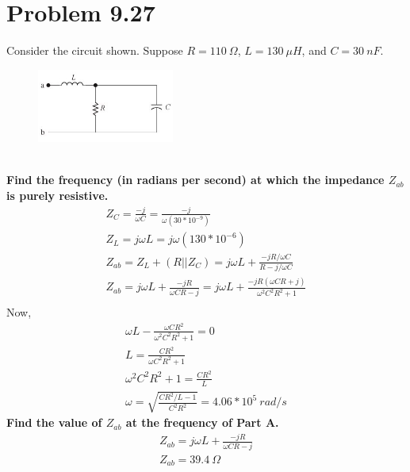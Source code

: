 \documentclass[12pt]{article}
\begin{document}
    \section*{Problem 9.27}
    Consider the circuit shown. Suppose $R = 110\ \Omega$, $L = 130\ \mu H$, and
    $C = 30\ nF$.
    \begin{figure}[h]
        \centering
        \includegraphics[width=0.4\textwidth]{9.27 Circuit.png}
    \end{figure}
    \\
    \textbf{Find the frequency (in radians per second) at which the impedance
    $Z_{ab}$ is purely resistive.}
    \begin{gather*}
        Z_{C} = \frac{-j}{\omega C} = \frac{-j}{\omega (30*10^{-9})} \\
        Z_{L} = j \omega L = j \omega (130*10^{-6}) \\
        Z_{ab} = Z_{L} + (R || Z_{C}) =  j \omega L + \frac{-jR / \omega C}{R -
        j / \omega C} \\
        Z_{ab} = j \omega L + \frac{-jR}{\omega C R - j} = j \omega L +
        \frac{-jR(\omega CR + j)}{\omega^2 C^2 R^2 + 1} \\
    \end{gather*}
    Now,
    \begin{gather*}
        \omega L - \frac{\omega C R^2}{\omega^2 C^2 R^2 + 1} = 0 \\
        L = \frac{C R^2}{\omega C^2 R^2 + 1} \\
        \omega^2 C^2 R^2 + 1 = \frac{C R^2}{L} \\
        \omega = \sqrt{\frac{C R^2 / L - 1}{C^2 R^2}} = \boxed{4.06*10^{5}\ rad
        / s}
    \end{gather*}
    \textbf{Find the value of $Z_{ab}$ at the frequency of Part A.}
    \begin{gather*}
        Z_{ab} = j \omega L + \frac{-jR}{\omega C R - j} \\
        Z_{ab} = \boxed{39.4\ \Omega}
    \end{gather*}
\end{document}
